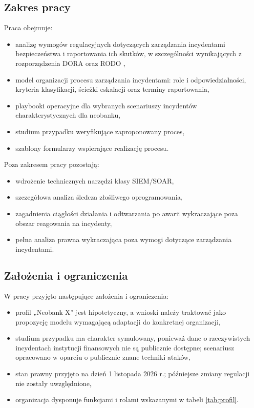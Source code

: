 \subsection{Zakres pracy}

Praca obejmuje:
\begin{itemize}
    \item analizę wymogów regulacyjnych dotyczących zarządzania incydentami bezpieczeństwa i raportowania ich skutków, w szczególności wynikających z rozporządzenia DORA \cite{dora2022} oraz RODO \cite{rodo2016},
    \item model organizacji procesu zarządzania incydentami: role i odpowiedzialności, kryteria klasyfikacji, ścieżki eskalacji oraz terminy raportowania,
    \item playbooki operacyjne dla wybranych scenariuszy incydentów charakterystycznych dla neobanku,
    \item studium przypadku weryfikujące zaproponowany proces,
    \item szablony formularzy wspierające realizację procesu.
\end{itemize}

Poza zakresem pracy pozostają:
\begin{itemize}
    \item wdrożenie technicznych narzędzi klasy SIEM/SOAR,
    \item szczegółowa analiza śledcza złośliwego oprogramowania,
    \item zagadnienia ciągłości działania i odtwarzania po awarii wykraczające poza obszar reagowania na incydenty,
    \item pełna analiza prawna wykraczająca poza wymogi dotyczące zarządzania incydentami.
\end{itemize}

\subsection{Założenia i ograniczenia}

W pracy przyjęto następujące założenia i ograniczenia:
\begin{itemize}
    \item profil „Neobank X” jest hipotetyczny, a wnioski należy traktować jako propozycję modelu wymagającą adaptacji do konkretnej organizacji,
    \item studium przypadku ma charakter symulowany, ponieważ dane o rzeczywistych incydentach instytucji finansowych nie są publicznie dostępne; scenariusz opracowano w oparciu o publicznie znane techniki ataków,
    \item stan prawny przyjęto na dzień 1 listopada 2026 r.; późniejsze zmiany regulacji nie zostały uwzględnione,
    \item organizacja dysponuje funkcjami i rolami wskazanymi w tabeli \ref{tab:profil}.
\end{itemize}



